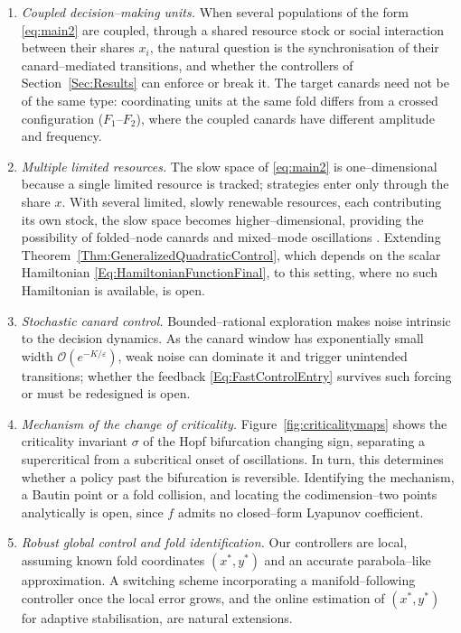 \documentclass[3p]{elsarticle}
\theoremstyle{plain}
\theoremstyle{remark}
\theoremstyle{definition}
\begin{document}
\begin{enumerate}
  \item[(i)] \emph{Coupled decision--making units.} When several populations of the form
  \eqref{eq:main2} are coupled, through a shared resource stock or social interaction between
  their shares $x_i$, the natural question is the synchronisation of their canard--mediated
  transitions, and whether the controllers of Section~\ref{Sec:Results} can enforce or break
  it. The target canards need not be of the same type: coordinating units at the same fold
  differs from a crossed configuration ($F_1$--$F_2$), where the coupled canards have
  different amplitude and frequency.
  \item[(ii)] \emph{Multiple limited resources.} The slow space of \eqref{eq:main2} is
  one--dimensional because a single limited resource is tracked; strategies enter only through
  the share $x$. With several limited, slowly renewable resources, each contributing its own
  stock, the slow space becomes higher--dimensional, providing the possibility of
  folded--node canards and mixed--mode oscillations \cite{Ref:Szmolyan2001,Ref:Desroches2016}. Extending
  Theorem~\ref{Thm:GeneralizedQuadraticControl}, which depends on the scalar Hamiltonian
  \eqref{Eq:HamiltonianFunctionFinal}, to this setting, where no such Hamiltonian is available, is open.
  \item[(iii)] \emph{Stochastic canard control.} Bounded--rational exploration makes noise
  intrinsic to the decision dynamics. As the canard window has exponentially small width
  $\mathcal{O}(e^{-K/\varepsilon})$, weak noise can dominate it and trigger unintended
  transitions; whether the feedback \eqref{Eq:FastControlEntry} survives such forcing or must
  be redesigned is open.
  \item[(iv)] \emph{Mechanism of the change of criticality.} Figure~\ref{fig:criticalitymaps}
  shows the criticality invariant $\sigma$ of the Hopf bifurcation changing sign, separating a supercritical from a subcritical onset of oscillations. In turn, this determines whether a policy past the bifurcation
  is reversible. Identifying the mechanism, a Bautin point or a fold collision, and locating
  the codimension--two points analytically is open, since $f$ admits no closed--form Lyapunov
  coefficient.
  \item[(v)] \emph{Robust global control and fold identification.} Our controllers are local,
  assuming known fold coordinates $(x^{\ast},y^{\ast})$ and an accurate parabola--like
  approximation. A switching scheme incorporating a manifold--following controller once the
  local error grows, and the online estimation of $(x^{\ast},y^{\ast})$ for adaptive
  stabilisation, are natural extensions.
\end{enumerate}
    
\end{document}
